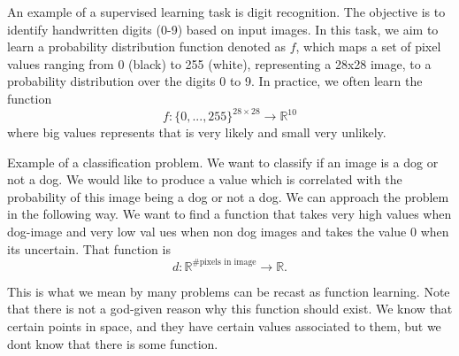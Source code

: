 \documentclass[../main.tex]{subfiles}
\begin{document}
	\begin{xmpl}
		\noindent An example of a supervised learning task is digit recognition. The objective is to identify handwritten digits (0-9) based on input images. In this task, we aim to learn a probability distribution function denoted as $f$, which maps a set of pixel values ranging from 0 (black) to 255 (white), representing a 28x28 image, to a probability distribution over the digits 0 to 9. In practice, we often learn the function 
		$$f: \{0,...,255\}^{28 \times 28} \longrightarrow \mathbb{R}^{10}$$
		where big values represents that is very likely and small very unlikely. 
	\end{xmpl}
	\begin{xmpl} Example of a classification problem. We want to classify if an image is a dog or not a dog. We would like to produce a value which is correlated with the probability of this image being a dog or not a dog.  We can approach the problem in the following way. We want to find a function that takes very high values when dog-image and very low val ues when non dog images and takes the value 0 when its uncertain. That function is
		$$d: \mathbb{R}^{\# \text{pixels in image}} \rightarrow \mathbb{R}. $$
		
		\noindent This is what we mean by many problems can be recast as function learning. Note that there is not a god-given reason why this function should exist. We know that certain points in space, and they have certain values associated to them, but we dont know that there is some function. 
	\end{xmpl}

	
\end{document}
